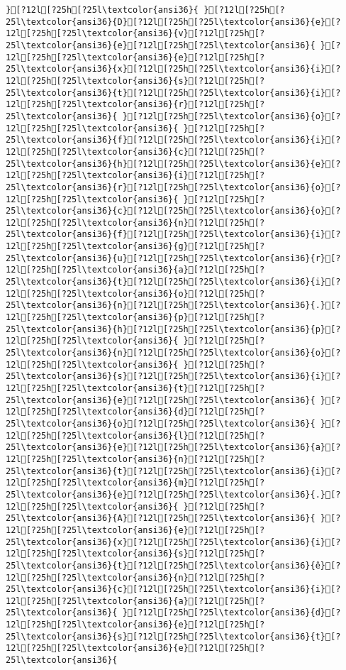 \documentclass{scrartcl}
\begin{document}
\begin{Verbatim}
}[?12l[?25h[?25l\textcolor{ansi36}{ }[?12l[?25h[?25l\textcolor{ansi36}{D}[?12l[?25h[?25l\textcolor{ansi36}{e}[?12l[?25h[?25l\textcolor{ansi36}{v}[?12l[?25h[?25l\textcolor{ansi36}{e}[?12l[?25h[?25l\textcolor{ansi36}{ }[?12l[?25h[?25l\textcolor{ansi36}{e}[?12l[?25h[?25l\textcolor{ansi36}{x}[?12l[?25h[?25l\textcolor{ansi36}{i}[?12l[?25h[?25l\textcolor{ansi36}{s}[?12l[?25h[?25l\textcolor{ansi36}{t}[?12l[?25h[?25l\textcolor{ansi36}{i}[?12l[?25h[?25l\textcolor{ansi36}{r}[?12l[?25h[?25l\textcolor{ansi36}{ }[?12l[?25h[?25l\textcolor{ansi36}{o}[?12l[?25h[?25l\textcolor{ansi36}{ }[?12l[?25h[?25l\textcolor{ansi36}{f}[?12l[?25h[?25l\textcolor{ansi36}{i}[?12l[?25h[?25l\textcolor{ansi36}{c}[?12l[?25h[?25l\textcolor{ansi36}{h}[?12l[?25h[?25l\textcolor{ansi36}{e}[?12l[?25h[?25l\textcolor{ansi36}{i}[?12l[?25h[?25l\textcolor{ansi36}{r}[?12l[?25h[?25l\textcolor{ansi36}{o}[?12l[?25h[?25l\textcolor{ansi36}{ }[?12l[?25h[?25l\textcolor{ansi36}{c}[?12l[?25h[?25l\textcolor{ansi36}{o}[?12l[?25h[?25l\textcolor{ansi36}{n}[?12l[?25h[?25l\textcolor{ansi36}{f}[?12l[?25h[?25l\textcolor{ansi36}{i}[?12l[?25h[?25l\textcolor{ansi36}{g}[?12l[?25h[?25l\textcolor{ansi36}{u}[?12l[?25h[?25l\textcolor{ansi36}{r}[?12l[?25h[?25l\textcolor{ansi36}{a}[?12l[?25h[?25l\textcolor{ansi36}{t}[?12l[?25h[?25l\textcolor{ansi36}{i}[?12l[?25h[?25l\textcolor{ansi36}{o}[?12l[?25h[?25l\textcolor{ansi36}{n}[?12l[?25h[?25l\textcolor{ansi36}{.}[?12l[?25h[?25l\textcolor{ansi36}{p}[?12l[?25h[?25l\textcolor{ansi36}{h}[?12l[?25h[?25l\textcolor{ansi36}{p}[?12l[?25h[?25l\textcolor{ansi36}{ }[?12l[?25h[?25l\textcolor{ansi36}{n}[?12l[?25h[?25l\textcolor{ansi36}{o}[?12l[?25h[?25l\textcolor{ansi36}{ }[?12l[?25h[?25l\textcolor{ansi36}{s}[?12l[?25h[?25l\textcolor{ansi36}{i}[?12l[?25h[?25l\textcolor{ansi36}{t}[?12l[?25h[?25l\textcolor{ansi36}{e}[?12l[?25h[?25l\textcolor{ansi36}{ }[?12l[?25h[?25l\textcolor{ansi36}{d}[?12l[?25h[?25l\textcolor{ansi36}{o}[?12l[?25h[?25l\textcolor{ansi36}{ }[?12l[?25h[?25l\textcolor{ansi36}{l}[?12l[?25h[?25l\textcolor{ansi36}{e}[?12l[?25h[?25l\textcolor{ansi36}{a}[?12l[?25h[?25l\textcolor{ansi36}{n}[?12l[?25h[?25l\textcolor{ansi36}{t}[?12l[?25h[?25l\textcolor{ansi36}{i}[?12l[?25h[?25l\textcolor{ansi36}{m}[?12l[?25h[?25l\textcolor{ansi36}{e}[?12l[?25h[?25l\textcolor{ansi36}{.}[?12l[?25h[?25l\textcolor{ansi36}{ }[?12l[?25h[?25l\textcolor{ansi36}{A}[?12l[?25h[?25l\textcolor{ansi36}{ }[?12l[?25h[?25l\textcolor{ansi36}{e}[?12l[?25h[?25l\textcolor{ansi36}{x}[?12l[?25h[?25l\textcolor{ansi36}{i}[?12l[?25h[?25l\textcolor{ansi36}{s}[?12l[?25h[?25l\textcolor{ansi36}{t}[?12l[?25h[?25l\textcolor{ansi36}{ê}[?12l[?25h[?25l\textcolor{ansi36}{n}[?12l[?25h[?25l\textcolor{ansi36}{c}[?12l[?25h[?25l\textcolor{ansi36}{i}[?12l[?25h[?25l\textcolor{ansi36}{a}[?12l[?25h[?25l\textcolor{ansi36}{ }[?12l[?25h[?25l\textcolor{ansi36}{d}[?12l[?25h[?25l\textcolor{ansi36}{e}[?12l[?25h[?25l\textcolor{ansi36}{s}[?12l[?25h[?25l\textcolor{ansi36}{t}[?12l[?25h[?25l\textcolor{ansi36}{e}[?12l[?25h[?25l\textcolor{ansi36}{ 
\end{Verbatim}
\end{document}
